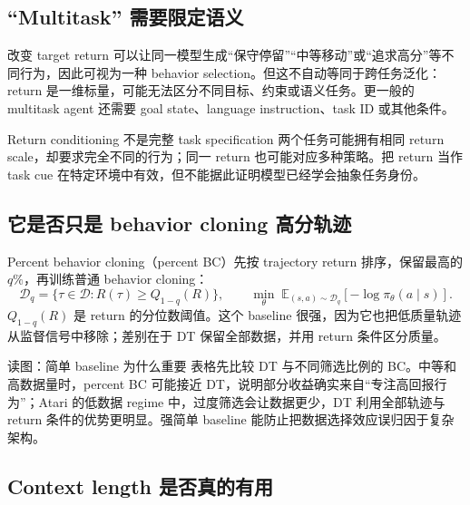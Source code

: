 \subsection{“Multitask” 需要限定语义}

改变 target return 可以让同一模型生成“保守停留”“中等移动”或“追求高分”等不同行为，因此可视为一种 behavior selection。但这不自动等同于跨任务泛化：return 是一维标量，可能无法区分不同目标、约束或语义任务。更一般的 multitask agent 还需要 goal state、language instruction、task ID 或其他条件。

\begin{warningbox}{Return conditioning 不是完整 task specification}
两个任务可能拥有相同 return scale，却要求完全不同的行为；同一 return 也可能对应多种策略。把 return 当作 task cue 在特定环境中有效，但不能据此证明模型已经学会抽象任务身份。
\end{warningbox}

\subsection{它是否只是 behavior cloning 高分轨迹}

Percent behavior cloning（percent BC）先按 trajectory return 排序，保留最高的 $q\%$，再训练普通 behavior cloning：
\[
\mathcal{D}_{q}=\{\tau\in\mathcal{D}:R(\tau)\ge Q_{1-q}(R)\},
\qquad
\min_{\theta}\;\mathbb{E}_{(s,a)\sim\mathcal{D}_q}[-\log\pi_{\theta}(a\mid s)].
\]
$Q_{1-q}(R)$ 是 return 的分位数阈值。这个 baseline 很强，因为它也把低质量轨迹从监督信号中移除；差别在于 DT 保留全部数据，并用 return 条件区分质量。


\begin{knowledgebox}{读图：简单 baseline 为什么重要}
表格先比较 DT 与不同筛选比例的 BC。中等和高数据量时，percent BC 可能接近 DT，说明部分收益确实来自“专注高回报行为”；Atari 的低数据 regime 中，过度筛选会让数据更少，DT 利用全部轨迹与 return 条件的优势更明显。强简单 baseline 能防止把数据选择效应误归因于复杂架构。
\end{knowledgebox}


\subsection{Context length 是否真的有用}

